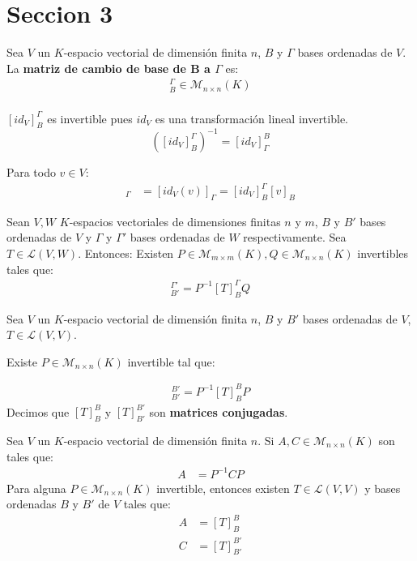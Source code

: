 \section{Seccion 3}

\begin{definition}{}{}
    Sea $V$ un $K$-espacio vectorial de dimensión finita $n$, $B$ y $\Gamma$ bases ordenadas de $V$.
    La \textbf{matriz de cambio de base de B a $\Gamma$} es:
    \begin{align*}
        [id_V]_B^\Gamma \in \mathcal{M}_{n \times n}(K)\\
    \end{align*}
\end{definition}
\begin{obs}{}{}
    $[id_V]_B^\Gamma$ es invertible pues $id_V$ es una transformación lineal invertible.
    $$([id_V]_B^\Gamma)^{-1} = [id_V]_\Gamma^B$$
\end{obs}
\begin{obs}{}{}
    Para todo $v \in V$:
    \begin{align*}
        [v]_\Gamma &= [id_V(v)]_\Gamma = [id_V]_B^\Gamma [v]_B
    \end{align*}
\end{obs}
\begin{theorem}{}{}
    Sean $V, W$ $K$-espacios vectoriales de dimensiones finitas $n$ y $m$, $B$ y $B'$ bases ordenadas de $V$ y $\Gamma$ y $\Gamma'$ bases ordenadas de $W$ respectivamente. Sea $T \in \mathcal{L}(V,W)$. Entonces:
    Existen $P \in \mathcal{M}_{m \times m}(K), Q \in \mathcal{M}_{n \times n}(K)$ invertibles tales que:
    \begin{align*}
        [T]_{B'}^{\Gamma'} = P^{-1} [T]_{B}^{\Gamma} Q
    \end{align*}
\end{theorem}
\begin{corollary}{}{}
    Sea $V$ un $K$-espacio vectorial de dimensión finita $n$, $B$ y $B'$ bases ordenadas de $V$, $T \in \mathcal{L}(V, V)$.

    Existe $P \in \mathcal{M}_{n \times n}(K)$ invertible tal que:

    \begin{align*}
        [T]_{B'}^{B'} = P^{-1} [T]_{B}^{B} P
    \end{align*}
    Decimos que $[T]_{B}^{B}$ y $[T]_{B'}^{B'}$ son \textbf{matrices conjugadas}.
\end{corollary}
\begin{theorem}{}{}
    Sea $V$ un $K$-espacio vectorial de dimensión finita $n$. Si $A, C \in \mathcal{M}_{n \times n} (K)$ son tales que:
    \begin{align*}
        A &= P^{-1} C P
    \end{align*}
    Para alguna $P \in \mathcal{M}_{n \times n}(K)$ invertible, entonces existen $T \in \mathcal{L}(V,V)$ y bases ordenadas $B$ y $B'$ de $V$ tales que:
    \begin{align*}
        A &= [T]_B^B\\
        C &= [T]_{B'}^{B'}
    \end{align*}
\end{theorem}
